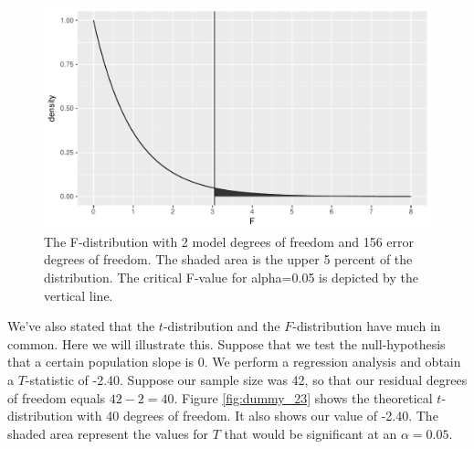 \documentclass[]{report}\usepackage[]{graphicx}\usepackage[]{color}
\makeatletter
\def\maxwidth{ %
  \ifdim\Gin@nat@width>\linewidth
    \linewidth
  \else
    \Gin@nat@width
  \fi
}
\newenvironment{knitrout}{}{} %
\makeatother
\begin{document}
\begin{knitrout}
\color{fgcolor}\begin{figure}

{\centering \includegraphics[width=\maxwidth]{figure/dummy_22-1} 

}

\caption[The F-distribution with 2 model degrees of freedom and 156 error degrees of freedom]{The F-distribution with 2 model degrees of freedom and 156 error degrees of freedom. The shaded area is the upper 5 percent of the distribution. The critical F-value for alpha=0.05 is depicted by the vertical line.}\label{fig:dummy_22}
\end{figure}


\end{knitrout}


We've also stated that the $t$-distribution and the $F$-distribution have much in common. Here we will illustrate this. Suppose that we test the null-hypothesis that a certain population slope is 0. We perform a regression analysis and obtain a $T$-statistic of -2.40. Suppose our sample size was 42, so that our residual degrees of freedom equals $42-2=40$. Figure \ref{fig:dummy_23} shows the theoretical $t$-distribution with 40 degrees of freedom. It also shows our value of -2.40. The shaded area represent the values for $T$ that would be significant at an $\alpha=0.05$.   
\end{document}
